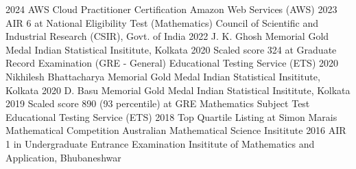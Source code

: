 \documentclass[9pt]{developercv} %
\begin{document}
\begin{entrylist}
    \vspace*{-0.5cm}
    \entry
    {2024}
    {AWS Cloud Practitioner Certification}
    {Amazon Web Services (AWS)}
    {}
    \vspace*{-0.5cm}
    \entry
    {2023}
    {AIR 6 at National Eligibility Test (Mathematics)}
    {Council of Scientific and Industrial Research (CSIR), Govt. of India}
    {}
    \vspace*{-0.5cm}
    \entry
    {2022}
    {J. K. Ghosh Memorial Gold Medal}
    {Indian Statistical Insititute, Kolkata}
    {}
    \vspace*{-0.5cm}
    \entry
    {2020}
    {Scaled score 324 at Graduate Record Examination (GRE - General)}
    {Educational Testing Service (ETS)}
    {}
    \vspace*{-0.5cm}
    \entry
    {2020}
    {Nikhilesh Bhattacharya Memorial Gold Medal}
    {Indian Statistical Insititute, Kolkata}
    {}
    \vspace*{-0.5cm}
    \entry
    {2020}
    {D. Basu Memorial Gold Medal}
    {Indian Statistical Insititute, Kolkata}
    {}
    \vspace*{-0.5cm}
    \entry
    {2019}
    {Scaled score 890 (93 percentile) at GRE Mathematics Subject Test}
    {Educational Testing Service (ETS)}
    {}
    \vspace*{-0.5cm}
    \entry
    {2018}
    {Top Quartile Listing at Simon Marais Mathematical Competition}
    {Australian Mathematical Science Insititute}
    {}
    \vspace*{-0.5cm}
    \entry
    {2016}
    {AIR 1 in Undergraduate Entrance Examination}
    {Insititute of Mathematics and Application, Bhubaneshwar}
    {}
\end{entrylist}



\vspace{-10 pt}
\vspace{-6pt}
\end{document}
